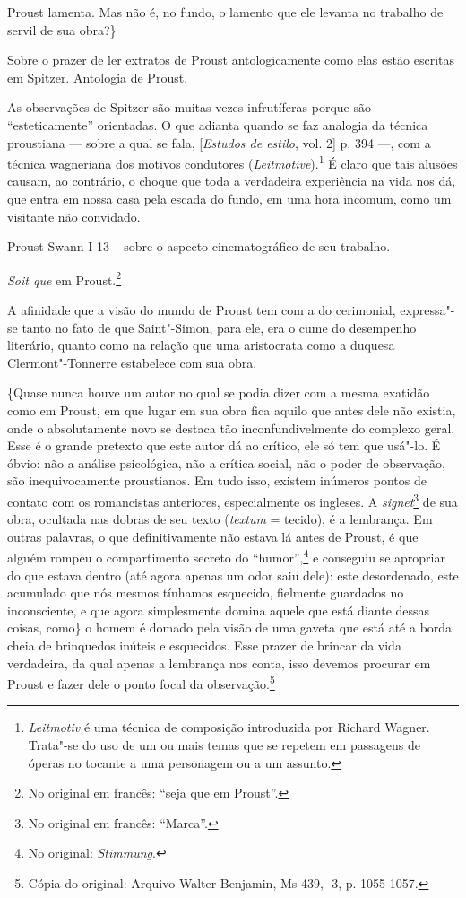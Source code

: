 Proust lamenta. Mas não é, no fundo, o lamento que ele levanta no
trabalho de servil de sua obra?\}

Sobre o prazer de ler extratos de Proust antologicamente como elas estão
escritas em Spitzer. Antologia de Proust.

As observações de Spitzer são muitas vezes infrutíferas porque são
``esteticamente'' orientadas. O que adianta quando se faz analogia da
técnica proustiana --- sobre a qual se fala, {[}\emph{Estudos de estilo},
vol. 2{]} p. 394 ---, com a técnica wagneriana dos motivos condutores
(\emph{Leitmotive}).\footnote{\emph{Leitmotiv} é uma técnica de
  composição introduzida por Richard Wagner. Trata"-se do uso de um ou
  mais temas que se repetem em passagens de óperas no tocante a uma
  personagem ou a um assunto. \versal{[N. E.]}} É claro que tais alusões causam, ao
contrário, o choque que toda a verdadeira experiência na vida nos dá,
que entra em nossa casa pela escada do fundo, em uma hora incomum, como
um visitante não convidado.

Proust Swann I 13 -- sobre o aspecto cinematográfico de seu trabalho.

\emph{Soit que} em Proust.\footnote{No original em francês: ``seja
  que em Proust''. \versal{[N. T.]}}

A afinidade que a visão do mundo de Proust tem com a do cerimonial,
expressa"-se tanto no fato de que Saint"-Simon, para ele, era o cume do
desempenho literário, quanto como na relação que uma aristocrata como a
duquesa Clermont"-Tonnerre estabelece com sua obra.

\{Quase nunca houve um autor no qual se podia dizer com a mesma exatidão
como em Proust, em que lugar em sua obra fica aquilo que antes dele não
existia, onde o absolutamente novo se destaca tão inconfundivelmente do
complexo geral. Esse é o grande pretexto que este autor dá ao crítico,
ele só tem que usá"-lo. É óbvio: não a análise psicológica, não a crítica
social, não o poder de observação, são inequivocamente proustianos. Em
tudo isso, existem inúmeros pontos de contato com os romancistas
anteriores, especialmente os ingleses. A \emph{signet}\footnote{No
  original em francês: ``Marca''. \versal{[N. T.]}} de sua obra, ocultada nas dobras de
seu texto (\emph{textum} = tecido), é a lembrança. Em outras palavras, o
que definitivamente não estava lá antes de Proust, é que alguém rompeu o
compartimento secreto do ``humor'',\footnote{No original:
  \emph{Stimmung}. \versal{[N. T.]}} e conseguiu se apropriar do que estava dentro (até
agora apenas um odor saiu dele): este desordenado, este acumulado que
nós mesmos tínhamos esquecido, fielmente guardados no inconsciente, e
que agora simplesmente domina aquele que está diante dessas coisas,
como\} o homem é domado pela visão de uma gaveta que está até a borda
cheia de brinquedos inúteis e esquecidos. Esse prazer de brincar da vida
verdadeira, da qual apenas a lembrança nos conta, isso devemos procurar
em Proust e fazer dele o ponto focal da observação.\footnote{Cópia do original: Arquivo Walter Benjamin, Ms 439, -3, p. 1055-1057.}

